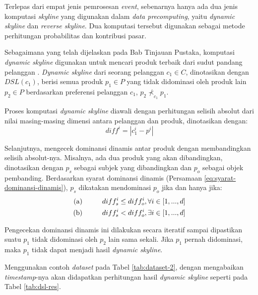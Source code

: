 Terlepas dari empat jenis pemrosesan \textit{event}, sebenarnya hanya ada dua jenis komputasi \textit{skyline} yang digunakan dalam \textit{data precomputing}, yaitu \textit{dynamic skyline} dan \textit{reverse skyline}. Dua komputasi tersebut digunakan sebagai metode perhitungan probabilitas dan kontribusi pasar. 


Sebagaimana yang telah dijelaskan pada Bab Tinjauan Pustaka, komputasi \textit{dynamic skyline} digunakan untuk mencari produk terbaik dari sudut pandang pelanggan \cite{kmpp}. \textit{Dynamic skyline} \cite{dynamic-skyline} dari seorang pelanggan $c_1 \in C$, dinotasikan dengan $DSL(c_1)$, berisi semua produk $p_1 \in P$ yang tidak didominasi oleh produk lain $p_2 \in P$ berdasarkan preferensi pelanggan $c_1$, $p_2 \nprec_{c_1} p_1$. 

Proses komputasi \textit{dynamic skyline} diawali dengan perhitungan selisih absolut dari nilai masing-masing dimensi antara pelanggan dan produk, dinotasikan dengan:
\begin{equation}\label{eq:diff}
diff^i = |c_1^i - p^i|
\end{equation}

Selanjutnya, mengecek dominansi dinamis antar produk dengan membandingkan selisih absolut-nya. Misalnya, ada dua produk yang akan dibandingkan, dinotasikan dengan $p_s$ sebagai subjek yang dibandingkan dan $p_o$ sebagai objek pembanding. Berdasarkan syarat dominansi dinamis (Persamaan \ref{eq:syarat-dominansi-dinamis}), $p_s$ dikatakan mendominasi $p_o$ jika dan hanya jika:
\begin{equation}\label{eq:komputasi-dsl}
\begin{split}
\text{(a)} \hspace*{1cm} diff_s^i \leq diff_o^i, \forall i \in [1, ..., d] \\
\text{(b)} \hspace*{1cm} diff_s^i < diff_o^i, \exists i \in [1, ..., d]
\end{split}
\end{equation}

Pengecekan dominansi dinamis ini dilakukan secara iteratif sampai dipastikan suatu $p_1$ tidak didominasi oleh $p_2$ lain sama sekali. Jika $p_1$ pernah didominasi, maka $p_1$ tidak dapat menjadi hasil \textit{dynamic skyline}.

Menggunakan contoh \textit{dataset} pada Tabel \ref{tab:dataset-2}, dengan mengabaikan \textit{timestamp}-nya akan didapatkan perhitungan hasil \textit{dynamic skyline} seperti pada Tabel \ref{tab:dsl-res}.

